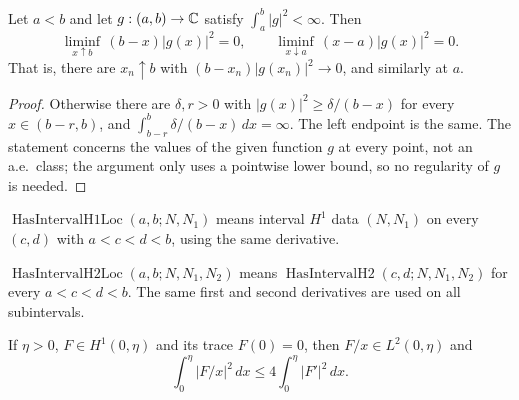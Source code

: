 \begin{lemma}
\label{lem:l2-endpoint-liminf}
\leanok
Let $a<b$ and let $g:(a,b)\to\mathbb{C}$ satisfy $\int_a^b|g|^2<\infty$. Then
\[
  \liminf_{x\uparrow b}\,(b-x)|g(x)|^2=0,\qquad
  \liminf_{x\downarrow a}\,(x-a)|g(x)|^2=0.
\]
That is, there are $x_n\uparrow b$ with $(b-x_n)|g(x_n)|^2\to0$, and
similarly at $a$.
\end{lemma}

\begin{proof}
\leanok
Otherwise there are $\delta,r>0$ with $|g(x)|^2\ge\delta/(b-x)$ for every
$x\in(b-r,b)$, and $\int_{b-r}^b\delta/(b-x)\,dx=\infty$. The left endpoint is
the same. The statement concerns the values of the given function $g$ at
every point, not an a.e.\ class; the argument only uses a pointwise lower
bound, so no regularity of $g$ is needed.
\end{proof}

\begin{definition}
\label{def:h1-local-interval}
\leanok
$\operatorname{HasIntervalH1Loc}(a,b;N,N_1)$ means interval $H^1$ data
$(N,N_1)$ on every $(c,d)$ with $a<c<d<b$, using the same derivative.
\end{definition}

\begin{definition}
\label{def:h2-local-interval}
\leanok
$\operatorname{HasIntervalH2Loc}(a,b;N,N_1,N_2)$ means
$\operatorname{HasIntervalH2}(c,d;N,N_1,N_2)$ for every
$a<c<d<b$. The same first and second derivatives are used on all
subintervals.
\end{definition}

\begin{lemma}
\label{lem:hardy-endpoint}
\leanok
If $\eta>0$, $F\in H^1(0,\eta)$ and its trace $F(0)=0$, then $F/x\in L^2(0,\eta)$ and
\[
  \int_0^\eta|F/x|^2\,dx\le4\int_0^\eta|F'|^2\,dx.
\]
\end{lemma}

